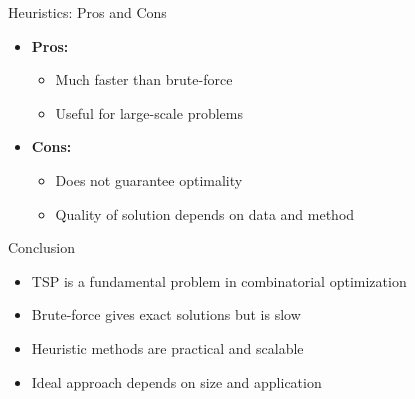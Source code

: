 \documentclass[mathserif,20pt,xcolor=table,compress,aspectratio=169]{beamer}
\begin{document}
\begin{frame}{Heuristics: Pros and Cons}
\begin{itemize}
    \item \textbf{Pros:}
    \begin{itemize}
        \item Much faster than brute-force
        \item Useful for large-scale problems
    \end{itemize}
    \item \textbf{Cons:}
    \begin{itemize}
        \item Does not guarantee optimality
        \item Quality of solution depends on data and method
    \end{itemize}
\end{itemize}
\end{frame}

\begin{frame}{Conclusion}
\begin{itemize}
    \item TSP is a fundamental problem in combinatorial optimization
    \item Brute-force gives exact solutions but is slow
    \item Heuristic methods are practical and scalable
    \item Ideal approach depends on size and application
\end{itemize}
\end{frame}
\end{document}
